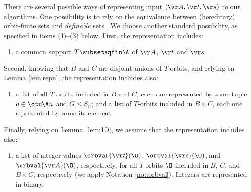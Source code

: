 There are several possible ways of representing input $(\vr A, \vr t, \vr s)$ to our algorithms.
One possibility is to rely on the equivalence between (hereditary) orbit-finite sets and
\emph{definable} sets \cite[Sect.~4]{atombook}.
We choose another standard possibility, as specified in items (1)--(3) below.
First, the representation includes:
\begin{enumerate}
\item[(1)]  a common support $T\subseteqfin\A$ of $\vr A$, $\vr t$ and $\vr s$.
\end{enumerate}
Second, knowing that $B$ and $C$ are disjoint unions of $T$-orbits, 
and relying on Lemma \ref{lem:repn}, the representation includes also:
\begin{enumerate}
\item[(2)] a list of all $T$-orbits included in $B$ and $C$, each one represented by some tuple $a\in\otu \A n$
and $G\leq S_n$; and a list of $T$-orbits included in $B\times C$, each one represented by some its element.
\end{enumerate}
Finally, relying on Lemma~\ref{lem:1O}, we assume that the representation includes also:
\begin{enumerate}
\item[(3)] a list of integer values $\orbval{\vr t}(\O)$, $\orbval{\vr s}(\O)$, and $\orbval{\vr A}(\O)$, respectively,  
for all $T$-orbits $\O$ included in $B$, $C$, and $B\times C$, respectively
(we apply Notation \ref{not:orbval}).
Integers are represented in binary.
\end{enumerate}
%
%
%
%
